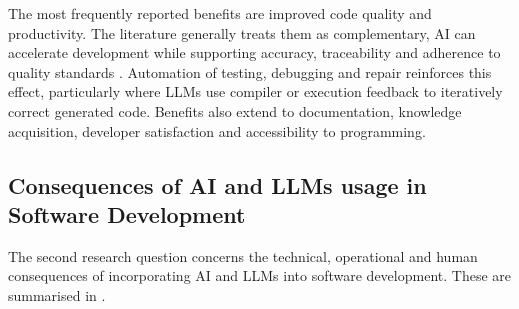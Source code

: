 The most frequently reported benefits are improved code quality and productivity. The literature generally treats them as complementary, AI can accelerate development while supporting accuracy, traceability and adherence to quality standards \cite{Kim:2025is}. Automation of testing, debugging and repair reinforces this effect, particularly where \acp{LLM} use compiler or execution feedback to iteratively correct generated code. Benefits also extend to documentation, knowledge acquisition, developer satisfaction and accessibility to programming.


\subsection{Consequences of AI and LLMs usage in Software Development}

The second research question concerns the technical, operational and human consequences of incorporating \ac{AI} and \acp{LLM} into software development. These are summarised in .

